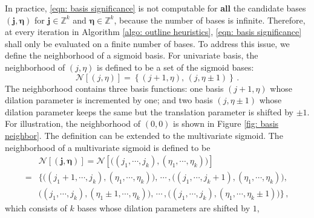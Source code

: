 In practice, \eqref{eqn: basis significance} is not computable
for \textbf{all} the candidate bases $(\boldsymbol{j}, \boldsymbol{\eta})$
for $\boldsymbol{j}\in \mathbb{Z}^k$ and
$\boldsymbol{\eta}\in \mathbb{Z}^k$, because the number of bases is infinite. 
Therefore, at every iteration in Algorithm \ref{algo: outline heuristics},
\eqref{eqn: basis significance} shall only be evaluated on a finite number of bases. 
To address this issue, we define the neighborhood of a sigmoid basis. 
For univariate basis, the neighborhood of $(j,\eta)$ is defined to be a set of the sigmoid bases:
\begin{equation}
    \mathcal{N}\left[ \left(j,\eta\right) \right]
    = \left\{ 
        \left( j+1, \eta\right),\,
        \left( j, \eta\pm 1 \right)
    \right\}\,.
    \label{eqn: neighborhood 1D}
\end{equation}
The neighborhood contains three basis functions: one basis 
$\left( j+1, \eta \right)$ 
whose dilation parameter is incremented by one; and
two basis $\left( j, \eta\pm 1 \right)$
whose dilation parameter keeps the same but the translation parameter is shifted by $\pm 1$.
For illustration, the neighborhood of $\left(0,0\right)$
is shown in Figure \ref{fig: basis neighbor}.
The definition can be extended to the multivariate sigmoid. 
The neighborhood of a multivariate sigmoid is defined to be
\begin{equation}\begin{split}
    &\mathcal{N}
    \left[
         \left(
               \boldsymbol{j}, \boldsymbol{\eta}
         \right)
    \right] = 
    \mathcal{N}\left[ \big((j_1, \cdots, j_k) , \left(
    \eta_1, \cdots, \eta_k \right) \big) \right]\\
    = & \bigg\{
            \big( \left( j_1+1,\cdots, j_k\right),
                   \left( \eta_1, \cdots, \eta_k \right)
            \big) ,\, \cdots \, ,
            \big( \left( j_1,\cdots, j_k+1\right),
                   \left( \eta_1, \cdots, \eta_k \right)
            \big),\,   \\
          & 
            \big( \left( j_1,\cdots, j_k\right),
                   \left( \eta_1\pm 1, \cdots, \eta_k \right)
            \big) ,\, \cdots \, ,
            \big( \left( j_1,\cdots, j_k\right),
                   \left( \eta_1, \cdots, \eta_k\pm 1 \right)
            \big) \bigg\}\,,
    \label{eqn: neighborhood kD}
\end{split}\end{equation}
which consists of $k$ bases whose dilation parameters are shifted by $1$, 
